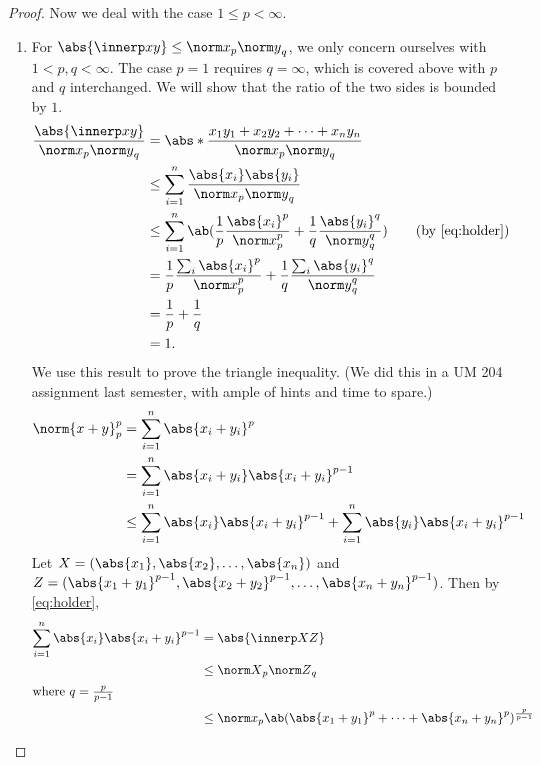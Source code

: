 \documentclass[12pt]{article}
\begin{document}
\begin{proof}
    Now we deal with the case $1 \le p < \infty$.
    \begin{enumerate}
        \item For $\abs{\innerp xy} \le {\norm x}_p {\norm y}_q$, we only
        concern ourselves with $1 < p, q < \infty$.
        The case $p = 1$ requires $q = \infty$, which is covered above with
        $p$ and $q$ interchanged.
        We will show that the ratio of the two sides is bounded by $1$.
        \begin{align*}
            \frac{\abs{\innerp xy}}{{\norm x}_p {\norm y}_q}
            &= \abs*{\frac{x_1 y_1 + x_2 y_2 + \dots + x_n y_n}{{\norm x}_p {\norm y}_q}} \\
            &\le \sum_{i=1}^n \frac{\abs{x_i} \abs{y_i}}{{\norm x}_p {\norm y}_q} \\
            &\le \sum_{i=1}^n \ab(\frac1p \frac{\abs{x_i}^p}{{\norm x}_p^p} + \frac1q \frac{\abs{y_i}^q}{{\norm y}_q^q}) \tag{by \cref{eq:holder}} \\
            &= \frac1p \frac{\sum_i \abs{x_i}^p}{{\norm x}_p^p} + \frac1q \frac{\sum_i \abs{y_i}^q}{{\norm y}_q^q} \\
            &= \frac1p + \frac1q \\
            &= 1.
        \end{align*}
        We use this result to prove the triangle inequality.
        (We did this in a UM 204 assignment last semester, with ample
        of hints and time to spare.)
        \begin{align*}
            {\norm {x + y}}_p^p
            &= \sum_{i=1}^n \abs{x_i + y_i}^p \\
            &= \sum_{i=1}^n \abs{x_i + y_i} \abs{x_i + y_i}^{p-1} \\
            &\le \sum_{i=1}^n \abs{x_i} \abs{x_i + y_i}^{p-1}
            + \sum_{i=1}^n \abs{y_i} \abs{x_i + y_i}^{p-1}
        \end{align*}
        Let $X = (\abs{x_1}, \abs{x_2}, \dots, \abs{x_n})$ and
        $Z = (\abs{x_1 + y_1}^{p-1}, \abs{x_2 + y_2}^{p-1}, \dots,
        \abs{x_n + y_n}^{p-1})$.
        Then by \cref{eq:holder}, \begin{align*}
            \sum_{i=1}^n \abs{x_i} \abs{x_i + y_i}^{p-1}
                &= \abs{\innerp XZ} \\
                &\le {\norm X}_p {\norm Z}_q \\
            \intertext{where $q = \frac{p}{p-1}$}
            &\le {\norm x}_p \ab(\abs{x_1 + y_1}^p + \dots + \abs{x_n + y_n}^p)^{\frac{p}{p-1}} \\

\end{align*}
\end{enumerate}
\end{proof}
\end{document}
